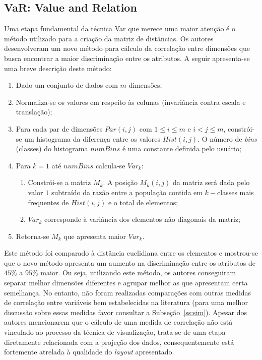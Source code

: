 


\subsection{VaR: Value and Relation}\label{sec:var}

Uma etapa fundamental da técnica Var que merece uma maior atenção é o método utilizado para a criação da matriz de distâncias. Os autores desenvolveram um novo método para cálculo da correlação entre dimensões que busca encontrar a maior discriminação entre os atributos. A seguir apresenta-se uma breve  descrição deste método:

\begin{enumerate}
   
    \item Dado um conjunto de dados com $m$ dimensões; 
    \item Normaliza-se os valores em respeito às colunas (invariância contra escala e translação);
    \item Para cada par de dimensões $Par(i,j)$ com $1 \leq i \leq m$ e $i < j \leq m$, constrói-se um histograma da diferença entre os valores $Hist(i,j)$. O número de \emph{bins} (classes) do histograma $numBins$ é uma constante definida pelo usuário;
    \item Para $k = 1$ até $numBins$ calcula-se $Var_k$:
    \begin{enumerate}
        \item Constrói-se a matriz $M_k$. A posição $M_k(i,j)$ da matriz será dada pelo valor $1$ subtraído da razão entre a população contida em $k-$classes mais frequentes de $Hist(i,j)$ e o total de elementos;
        \item $Var_k$ corresponde à variância dos elementos não diagonais da matriz;
    \end{enumerate}
\item Retorna-se $M_k$ que apresenta maior $Var_k$.

\end{enumerate}

Este método foi comparado à distância euclidiana entre os elementos e mostrou-se que o novo método apresenta um aumento na discriminação entre os atributos de $45\%$ a $95\%$ maior. Ou seja, utilizando este método, os autores conseguiram separar melhor dimensões diferentes e agrupar melhor as que apresentam certa semelhança. No entanto, não foram realizadas comparações com outras medidas de correlação entre variáveis bem estabelecidas na  literatura (para uma melhor discussão sobre essas medidas favor consultar a Subseção~\ref{ss:sim}). Apesar dos autores mencionarem que o cálculo de uma medida de correlação não está vinculado ao processo da técnica de visualização, trata-se de uma etapa diretamente relacionada com a projeção dos dados, consequentemente está fortemente atrelada à qualidade do \emph{layout} apresentado.

